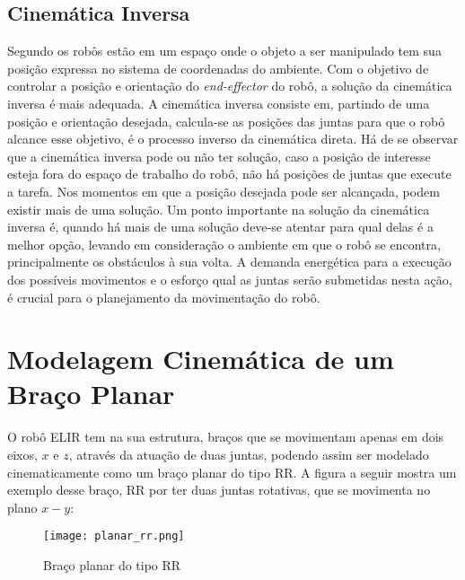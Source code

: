 \subsection{Cinemática Inversa}\label{sec:cinem_inv}
Segundo \cite{fu1987robotics} os robôs estão em um espaço onde o objeto a ser manipulado tem sua posição expressa no sistema de coordenadas do ambiente. Com o objetivo de controlar a posição e orientação do \textit{end-effector} do robô, a solução da cinemática inversa é mais adequada. A cinemática inversa consiste em, partindo de uma posição e orientação desejada, calcula-se as posições das juntas para que o robô alcance esse objetivo, é o processo inverso da cinemática direta. 
Há de se observar que a cinemática inversa pode ou não ter solução, caso a posição de interesse esteja fora do espaço de trabalho do robô, não há posições de juntas que execute a tarefa. Nos momentos em que a posição desejada pode ser alcançada, podem existir mais de uma solução. Um ponto importante na solução da cinemática inversa é, quando há mais de uma solução deve-se atentar para qual delas é a melhor opção, levando em consideração o ambiente em que o robô se encontra, principalmente os obstáculos à sua volta. A demanda energética para a execução dos possíveis movimentos e o esforço qual as juntas serão submetidas nesta ação, é crucial para o planejamento da movimentação do robô.


\section{Modelagem Cinemática de um Braço Planar}\label{sec:brac_plan}
O robô ELIR tem na sua estrutura, braços que se movimentam apenas em dois eixos, $x$ e $z$, através da atuação de duas juntas, podendo assim ser modelado cinematicamente como um braço planar do tipo RR. A figura a seguir mostra um exemplo desse braço, RR por ter duas juntas rotativas, que se movimenta no plano $x-y$:

\begin{figure}[h!]												
	\centering												
	\texttt{[image: planar\_rr.png]}			
	\caption{Braço planar do tipo RR}		
	\label{img:planar}	
\end{figure}

